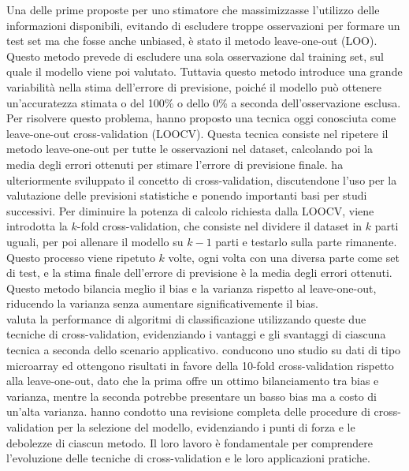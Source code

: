 Una delle prime proposte per uno stimatore che massimizzasse l’utilizzo delle informazioni disponibili, evitando di escludere troppe osservazioni per formare un test set ma che fosse anche unbiased, è stato il metodo leave-one-out (LOO). Questo metodo prevede di escludere una sola osservazione dal training set, sul quale il modello viene poi valutato. Tuttavia questo metodo introduce una grande variabilità nella stima dell’errore di previsione, poiché il modello può ottenere un’accuratezza stimata o del 100\% o dello 0\% a seconda dell’osservazione esclusa.\\
Per risolvere questo problema, \textcite{lachenbruch1968} hanno proposto una tecnica oggi conosciuta come leave-one-out cross-validation (LOOCV). Questa tecnica consiste nel ripetere il metodo leave-one-out per tutte le osservazioni nel dataset, calcolando poi la media degli errori ottenuti per stimare l’errore di previsione finale. \textcite{stone} ha ulteriormente sviluppato il concetto di cross-validation, discutendone l’uso per la valutazione delle previsioni statistiche e ponendo importanti basi per studi successivi. Per diminuire la potenza di calcolo richiesta dalla LOOCV, viene introdotta la $k$-fold cross-validation, che consiste nel dividere il dataset in $k$ parti uguali, per poi allenare il modello su $k-1$ parti e testarlo sulla parte rimanente. Questo processo viene ripetuto $k$ volte, ogni volta con una diversa parte come set di test, e la stima finale dell’errore di previsione è la media degli errori ottenuti. Questo metodo bilancia meglio il bias e la varianza rispetto al leave-one-out, riducendo la varianza senza aumentare significativemente il bias.\\
\textcite{wongTT} valuta la performance di algoritmi di classificazione utilizzando queste due tecniche di cross-validation, evidenziando i vantaggi e gli svantaggi di ciascuna tecnica a seconda dello scenario applicativo. \textcite{mclachlan} conducono uno studio su dati di tipo microarray ed ottengono risultati in favore della 10-fold cross-validation rispetto alla leave-one-out, dato che la prima offre un ottimo bilanciamento tra bias e varianza, mentre la seconda potrebbe presentare un basso bias ma a costo di un’alta varianza. \textcite{celisse} hanno condotto una revisione completa delle procedure di cross-validation per la selezione del modello, evidenziando i punti di forza e le debolezze di ciascun metodo. Il loro lavoro è fondamentale per comprendere l'evoluzione delle tecniche di cross-validation e le loro applicazioni pratiche.


